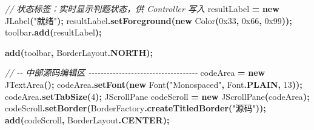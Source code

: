 \documentclass[
  11pt,
]{ctexart}
\newenvironment{Shaded}{\begin{snugshade}}{\end{snugshade}}
\newcommand{\BaseNTok}[1]{\textcolor[rgb]{0.00,0.00,0.81}{#1}}
\newcommand{\BuiltInTok}[1]{#1}
\newcommand{\CommentTok}[1]{\textcolor[rgb]{0.56,0.35,0.01}{\textit{#1}}}
\newcommand{\DecValTok}[1]{\textcolor[rgb]{0.00,0.00,0.81}{#1}}
\newcommand{\FunctionTok}[1]{\textcolor[rgb]{0.13,0.29,0.53}{\textbf{#1}}}
\newcommand{\KeywordTok}[1]{\textcolor[rgb]{0.13,0.29,0.53}{\textbf{#1}}}
\newcommand{\NormalTok}[1]{#1}
\newcommand{\OperatorTok}[1]{\textcolor[rgb]{0.81,0.36,0.00}{\textbf{#1}}}
\newcommand{\StringTok}[1]{\textcolor[rgb]{0.31,0.60,0.02}{#1}}
\begin{document}
\begin{Shaded}
\begin{Highlighting}[]
        \CommentTok{// 状态标签：实时显示判题状态，供 Controller 写入}
\NormalTok{        resultLabel }\OperatorTok{=} \KeywordTok{new} \BuiltInTok{JLabel}\OperatorTok{(}\StringTok{"就绪"}\OperatorTok{);}
\NormalTok{        resultLabel}\OperatorTok{.}\FunctionTok{setForeground}\OperatorTok{(}\KeywordTok{new} \BuiltInTok{Color}\OperatorTok{(}\BaseNTok{0x33}\OperatorTok{,} \BaseNTok{0x66}\OperatorTok{,} \BaseNTok{0x99}\OperatorTok{));}
\NormalTok{        toolbar}\OperatorTok{.}\FunctionTok{add}\OperatorTok{(}\NormalTok{resultLabel}\OperatorTok{);}

        \FunctionTok{add}\OperatorTok{(}\NormalTok{toolbar}\OperatorTok{,} \BuiltInTok{BorderLayout}\OperatorTok{.}\FunctionTok{NORTH}\OperatorTok{);}

        \CommentTok{// {-}{-} 中部源码编辑区 {-}{-}{-}{-}{-}{-}{-}{-}{-}{-}{-}{-}{-}{-}{-}{-}{-}{-}{-}{-}{-}{-}{-}{-}{-}{-}{-}{-}{-}{-}{-}{-}{-}{-}{-}{-}}
\NormalTok{        codeArea }\OperatorTok{=} \KeywordTok{new} \BuiltInTok{JTextArea}\OperatorTok{();}
\NormalTok{        codeArea}\OperatorTok{.}\FunctionTok{setFont}\OperatorTok{(}\KeywordTok{new} \BuiltInTok{Font}\OperatorTok{(}\StringTok{"Monospaced"}\OperatorTok{,} \BuiltInTok{Font}\OperatorTok{.}\FunctionTok{PLAIN}\OperatorTok{,} \DecValTok{13}\OperatorTok{));}
\NormalTok{        codeArea}\OperatorTok{.}\FunctionTok{setTabSize}\OperatorTok{(}\DecValTok{4}\OperatorTok{);}
        \BuiltInTok{JScrollPane}\NormalTok{ codeScroll }\OperatorTok{=} \KeywordTok{new} \BuiltInTok{JScrollPane}\OperatorTok{(}\NormalTok{codeArea}\OperatorTok{);}
\NormalTok{        codeScroll}\OperatorTok{.}\FunctionTok{setBorder}\OperatorTok{(}\BuiltInTok{BorderFactory}\OperatorTok{.}\FunctionTok{createTitledBorder}\OperatorTok{(}\StringTok{"源码"}\OperatorTok{));}
        \FunctionTok{add}\OperatorTok{(}\NormalTok{codeScroll}\OperatorTok{,} \BuiltInTok{BorderLayout}\OperatorTok{.}\FunctionTok{CENTER}\OperatorTok{);}


\end{Highlighting}
\end{Shaded}
\end{document}
